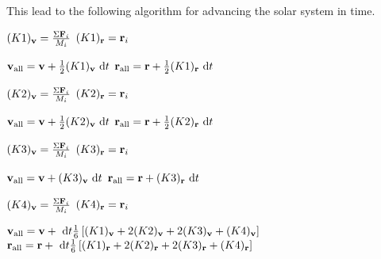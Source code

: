 This lead to the following algorithm for advancing the solar system
in time.
\begin{algorithmic}
            \State $(K1)_{\mathbf{v}} = \frac{\Sigma \mathbf{F}_i}{M_i}$
            \State $(K1)_{\mathbf{r}} = \mathbf{r}_i$
        \EndFor

        \State $\mathbf{v}_{\text{all}} = \mathbf{v} + \frac{1}{2}(K1)_{\mathbf{v}} \ \mathrm{d}t$
        \State $\mathbf{r}_{\text{all}} = \mathbf{r} + \frac{1}{2}(K1)_{\mathbf{r}} \ \mathrm{d}t$

            \State $(K2)_{\mathbf{v}} = \frac{\Sigma \mathbf{F}_i}{M_i}$
            \State $(K2)_{\mathbf{r}} = \mathbf{r}_i$
        \EndFor

        \State $\mathbf{v}_{\text{all}} = \mathbf{v} + \frac{1}{2}(K2)_{\mathbf{v}} \ \mathrm{d}t$
        \State $\mathbf{r}_{\text{all}} = \mathbf{r} + \frac{1}{2}(K2)_{\mathbf{r}} \ \mathrm{d}t$

            \State $(K3)_{\mathbf{v}} = \frac{\Sigma \mathbf{F}_i}{M_i}$
            \State $(K3)_{\mathbf{r}} = \mathbf{r}_i$
        \EndFor

        \State $\mathbf{v}_{\text{all}} = \mathbf{v} + (K3)_{\mathbf{v}} \ \mathrm{d}t$
        \State $\mathbf{r}_{\text{all}} = \mathbf{r} + (K3)_{\mathbf{r}} \ \mathrm{d}t$

            \State $(K4)_{\mathbf{v}} = \frac{\Sigma \mathbf{F}_i}{M_i}$
            \State $(K4)_{\mathbf{r}} = \mathbf{r}_i$
        \EndFor

        \State $\mathbf{v}_{\text{all}} = \mathbf{v} + \ \mathrm{d}t\frac{1}{6}\left[
            (K1)_{\mathbf{v}} + 2(K2)_{\mathbf{v}} + 2(K3)_{\mathbf{v}} + (K4)_{\mathbf{v}} \right]$
        \State $\mathbf{r}_{\text{all}} = \mathbf{r} + \ \mathrm{d}t\frac{1}{6}\left[
            (K1)_{\mathbf{r}} + 2(K2)_{\mathbf{r}} + 2(K3)_{\mathbf{r}} + (K4)_{\mathbf{r}} \right]$
    \EndFor
\end{algorithmic}
